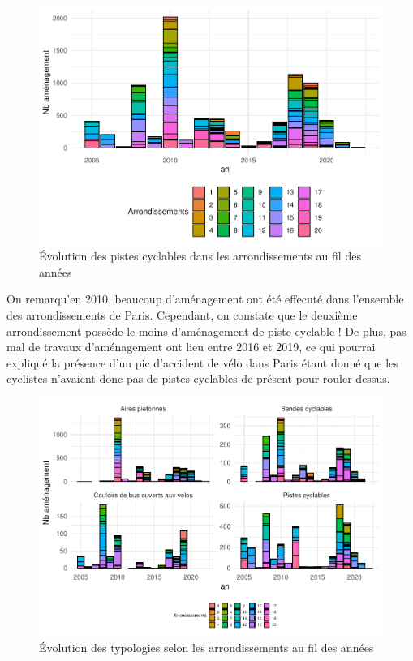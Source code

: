 \documentclass[french,]{compterendu}
\theoremstyle{urcastyle}
\theoremstyle{remark}
\begin{document}
\begin{figure}[H]

{\centering \includegraphics[width=1\linewidth]{Rapport_ADD_LEO-GABET_files/figure-latex/arrPARISdetails-1} 

}

\caption{Évolution des pistes cyclables dans les arrondissements au fil des années}\label{fig:arrPARISdetails}
\end{figure}

On remarqu'en 2010, beaucoup d'aménagement ont été effecuté dans l'ensemble des arrondissements de Paris. Cependant, on constate que le deuxième arrondissement possède le moins d'aménagement de piste cyclable ! De plus, pas mal de travaux d'aménagement ont lieu entre 2016 et 2019, ce qui pourrai expliqué la présence d'un pic d'accident de vélo dans Paris étant donné que les cyclistes n'avaient donc pas de pistes cyclables de présent pour rouler dessus.

\begin{figure}[H]

{\centering \includegraphics[width=1\linewidth]{Rapport_ADD_LEO-GABET_files/figure-latex/arrPARISTypo-1} 

}

\caption{Évolution des typologies selon les arrondissements au fil des années}\label{fig:arrPARISTypo}
\end{figure}
\end{document}
